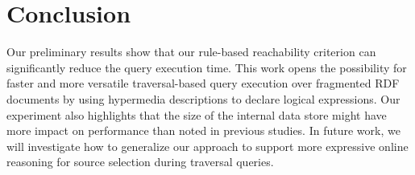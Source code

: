 \section{Conclusion}

Our preliminary results show that our rule-based reachability criterion can significantly reduce the query execution time.
This work opens the possibility for faster and more versatile traversal-based query execution over fragmented RDF documents by using hypermedia descriptions to declare logical expressions.
Our experiment also highlights that the size of the internal data store might have more impact on performance than noted in previous studies.
In future work, we will investigate how to generalize our approach to support more expressive online reasoning for source selection during traversal queries.
